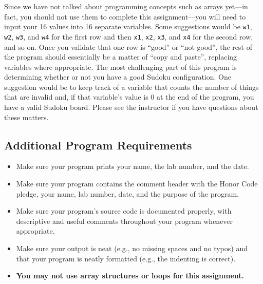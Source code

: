 Since we have not talked about programming concepts such as arrays yet---in fact, you should not use them to complete
this assignment---you will need to input your 16 values into 16 separate variables.  Some suggestions would be {\tt w1},
{\tt w2}, {\tt w3}, and {\tt w4} for the first row and then {\tt x1}, {\tt x2}, {\tt x3}, and {\tt x4} for the second
row, and so on.  Once you validate that one row is ``good'' or ``not good'', the rest of the program should essentially
be a matter of ``copy and paste'', replacing variables where appropriate.  The most challenging part of this program is
determining whether or not you have a good Sudoku configuration.  One suggestion would be to keep track of a variable
that counts the number of things that are invalid and, if that variable's value is 0 at the end of the program, you have
a valid Sudoku board. Please see the instructor if you have questions about these matters.

\vspace{-0.1in}
\subsection*{Additional Program Requirements}
\vspace{-0.05in}
\begin{itemize}

\itemsep0in

\item Make sure your program prints your name, the lab number, and the date.

\item Make sure your program contains the comment header with the Honor Code pledge, your name, lab number, date, and
  the purpose of the program.

\item Make sure your program's source code is documented properly, with descriptive and useful comments throughout your
  program whenever appropriate.

\item Make sure your output is neat (e.g., no missing spaces and no typos) and that your program is neatly formatted
  (e.g., the indenting is correct).

\item \textbf{You may not use array structures or loops for this assignment.}

\end{itemize}

\vspace{-0.2in}

